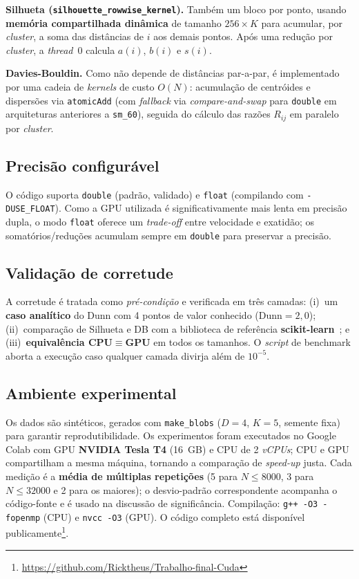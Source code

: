 \documentclass[12pt]{article}
\begin{document}
\textbf{Silhueta (\texttt{silhouette\_rowwise\_kernel}).} Também um bloco por
ponto, usando \textbf{memória compartilhada dinâmica} de tamanho
$256 \times K$ para acumular, por \emph{cluster}, a soma das distâncias de
$i$ aos demais pontos. Após uma redução por \emph{cluster}, a \emph{thread}~0
calcula $a(i)$, $b(i)$ e $s(i)$.

\textbf{Davies-Bouldin.} Como não depende de distâncias par-a-par, é
implementado por uma cadeia de \emph{kernels} de custo $O(N)$: acumulação de
centróides e dispersões via \texttt{atomicAdd} (com \emph{fallback} via
\emph{compare-and-swap} para \texttt{double} em arquiteturas anteriores a
\texttt{sm\_60}), seguida do cálculo das razões $R_{ij}$ em paralelo por
\emph{cluster}.

\subsection{Precisão configurável}
O código suporta \texttt{double} (padrão, validado) e \texttt{float}
(compilando com \texttt{-DUSE\_FLOAT}). Como a GPU utilizada é
significativamente mais lenta em precisão dupla, o modo \texttt{float}
oferece um \emph{trade-off} entre velocidade e exatidão; os
somatórios/reduções acumulam sempre em \texttt{double} para preservar a
precisão.

\subsection{Validação de corretude}
A corretude é tratada como \emph{pré-condição} e verificada em três camadas:
(i)~um \textbf{caso analítico} do Dunn com 4 pontos de valor conhecido
($\mathrm{Dunn}=2{,}0$); (ii)~comparação de Silhueta e DB com a biblioteca de
referência \textbf{scikit-learn}~\cite{scikit2011}; e (iii)~\textbf{equivalência
CPU$\equiv$GPU} em todos os tamanhos. O \emph{script} de benchmark aborta a
execução caso qualquer camada divirja além de $10^{-5}$.

\subsection{Ambiente experimental}
Os dados são sintéticos, gerados com \texttt{make\_blobs}
($D=4$, $K=5$, semente fixa) para garantir reprodutibilidade. Os
experimentos foram executados no Google Colab com GPU \textbf{NVIDIA Tesla
T4} (16~GB) e CPU de 2 \emph{vCPUs}; CPU e GPU compartilham a mesma máquina,
tornando a comparação de \emph{speed-up} justa. Cada medição é a
\textbf{média de múltiplas repetições} (5 para $N\le 8000$, 3 para
$N\le 32000$ e 2 para os maiores); o desvio-padrão correspondente acompanha
o código-fonte e é usado na discussão de significância. Compilação:
\texttt{g++ -O3 -fopenmp} (CPU) e \texttt{nvcc -O3} (GPU). O código completo
está disponível publicamente\footnote{\url{https://github.com/Ricktheus/Trabalho-final-Cuda}}.
\end{document}
